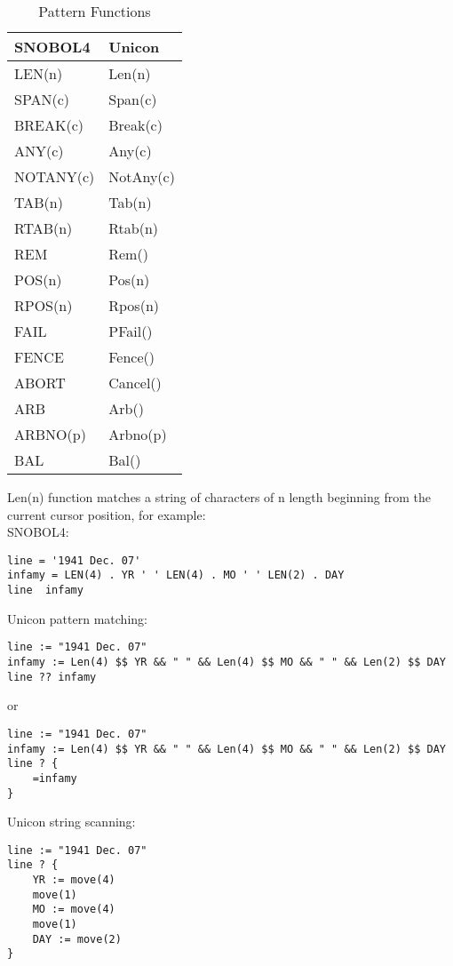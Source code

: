 \documentclass{article}
\begin{document}
\begin{table}[ht]
	\caption{Pattern Functions}
	\centering
	\begin{tabular}{|l|l|}
		\hline\hline
		SNOBOL4 & Unicon \\
		\hline
		LEN(n) & Len(n) \\
		SPAN(c) & Span(c)  \\
		BREAK(c) & Break(c) \\
		ANY(c) & Any(c) \\
		NOTANY(c) & NotAny(c) \\
		TAB(n) & Tab(n) \\
		RTAB(n) & Rtab(n) \\
		REM & Rem() \\
		POS(n) & Pos(n)  \\
		RPOS(n) & Rpos(n)  \\
		FAIL & PFail() \\
		FENCE & Fence() \\
		ABORT & Cancel() \\
		ARB & Arb() \\
		ARBNO(p) & Arbno(p) \\
		BAL & Bal() \\
		\hline
	\end{tabular}
\end{table}

\pagebreak
Len(n) function matches a string of characters of n length beginning from the current cursor position, for example: \\

\noindent
SNOBOL4:
\begin{verbatim}
line = '1941 Dec. 07'
infamy = LEN(4) . YR ' ' LEN(4) . MO ' ' LEN(2) . DAY
line  infamy
\end{verbatim}

\noindent
Unicon pattern matching:
\begin{verbatim}
line := "1941 Dec. 07"
infamy := Len(4) $$ YR && " " && Len(4) $$ MO && " " && Len(2) $$ DAY 
line ?? infamy
\end{verbatim}
or
\begin{verbatim}
line := "1941 Dec. 07"
infamy := Len(4) $$ YR && " " && Len(4) $$ MO && " " && Len(2) $$ DAY 
line ? {
	=infamy
}
\end{verbatim}

\noindent
Unicon string scanning:
\begin{verbatim}
line := "1941 Dec. 07"
line ? {
	YR := move(4)
	move(1)
	MO := move(4)
	move(1)
	DAY := move(2)
}
\end{verbatim}
\end{document}
